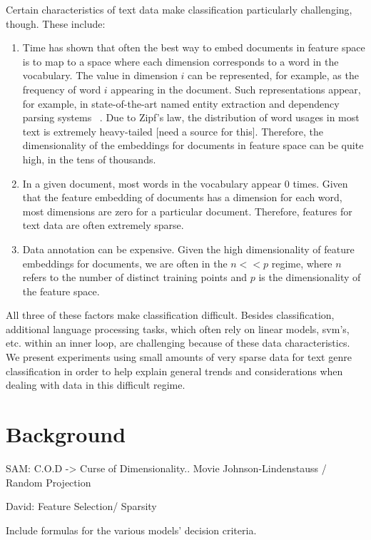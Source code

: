 \documentclass[]{article}
\begin{document}
Certain characteristics of text data make classification particularly challenging, though. These include:
\begin{enumerate}
\item Time has shown that often the best way to embed documents in feature space is to map to a space where each dimension corresponds to a word in the vocabulary. The value in dimension $i$ can be represented, for example, as the frequency of word $i$ appearing in the document. Such representations appear, for example, in state-of-the-art named entity extraction and dependency parsing systems ~\cite{ratinov2009design,nivre2004deterministic}. Due to Zipf's law, the distribution of word usages in most text is extremely heavy-tailed [need a source for this]. Therefore, the dimensionality of the embeddings for documents in feature space can be quite high, in the tens of thousands. 
\item  In a given document, most words in the vocabulary appear 0 times. Given that the feature embedding of documents has a dimension for each word, most dimensions are zero for a particular document. Therefore, features for text data are often extremely sparse. 
\item Data annotation can be expensive. Given the high dimensionality of feature embeddings for documents, we are often in the $n << p$ regime, where $n$ refers to the number of distinct training points and $p$ is the dimensionality of the feature space. 
\end{enumerate}

All three of these factors make classification difficult. Besides classification, additional language processing tasks, which often rely on linear models, svm's, etc. within an inner loop, are challenging because of these data characteristics.  We present experiments  using small amounts of very sparse data for text genre classification in order to help explain general trends and considerations when dealing with data in this difficult regime. 

\section{Background}

SAM: C.O.D -> Curse of Dimensionality.. Movie 
           Johnson-Lindenstauss / Random Projection 

David: Feature Selection/ Sparsity

Include formulas for the various models' decision criteria.
\end{document}

